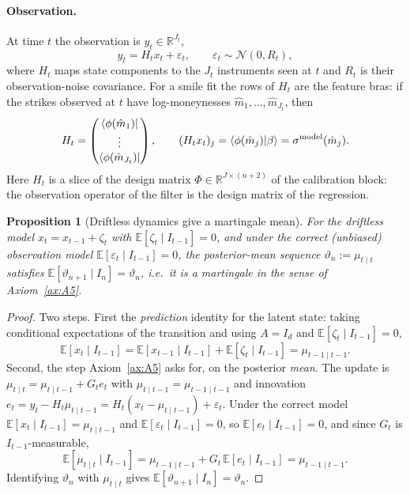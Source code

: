 \documentclass[11pt]{book}
\theoremstyle{plain}
\newtheorem{proposition}[theorem]{Proposition}
\theoremstyle{definition}
\theoremstyle{remark}
\newcommand{\bra}[1]{\mathinner{\langle #1 \rvert}}
\newcommand{\braket}[1]{\mathinner{\langle #1 \rangle}}
\newcommand{\ncdf}{N}                            %
\newcommand{\Nrm}{\mathcal{N}}                   %
\newcommand{\parvec}{\vartheta}                  %
\newcommand{\E}{\mathbb{E}}
\begin{document}
\paragraph{Observation.} At time $t$ the observation is $y_t\in\mathbb{R}^{J_t}$,
\[
    y_t = H_t x_t + \varepsilon_t,
    \qquad \varepsilon_t\sim\Nrm(0,R_t),
\]
where $H_t$ maps state components to the $J_t$ instruments seen at $t$ and $R_t$
is their observation-noise covariance. For a smile fit the rows of $H_t$ are the
feature bras: if the strikes observed at $t$ have log-moneynesses
$\hat m_1,\dots,\hat m_{J_t}$, then
\[
    H_t = \begin{pmatrix}\bra{\phi(\hat m_1)}\\ \vdots\\
    \bra{\phi(\hat m_{J_t})}\end{pmatrix},
    \qquad
    (H_t x_t)_j = \braket{\phi(\hat m_j)|\beta}
    = \sigma^{\text{model}}(\hat m_j).
\]
Here $H_t$ is a slice of the design matrix $\Phi\in\mathbb{R}^{J\times(n+2)}$ of
the calibration block: the observation operator of the filter is the design
matrix of the regression.

\begin{proposition}[Driftless dynamics give a martingale mean]
\label{prop:martingale}
For the driftless model $x_t=x_{t-1}+\zeta_t$ with $\E[\zeta_t\mid I_{t-1}]=0$,
and under the correct (unbiased) observation model $\E[\varepsilon_t\mid
I_{t-1}]=0$, the \emph{posterior-mean} sequence $\parvec_n:=\mu_{t\mid t}$
satisfies $\E[\parvec_{n+1}\mid I_n]=\parvec_n$, i.e.\ it is a martingale in the
sense of Axiom~\ref{ax:A5}.
\end{proposition}

\begin{proof}
Two steps. First the \emph{prediction} identity for the latent state: taking
conditional expectations of the transition and using $A=I_d$ and
$\E[\zeta_t\mid I_{t-1}]=0$,
\[
    \E[x_t\mid I_{t-1}] = \E[x_{t-1}\mid I_{t-1}] + \E[\zeta_t\mid I_{t-1}]
    = \mu_{t-1\mid t-1}.
\]
Second, the step Axiom~\ref{ax:A5} asks for, on the posterior
\emph{mean}. The update is $\mu_{t\mid t}=\mu_{t\mid t-1}+G_t e_t$ with
$\mu_{t\mid t-1}=\mu_{t-1\mid t-1}$ and innovation
$e_t=y_t-H_t\mu_{t\mid t-1}=H_t(x_t-\mu_{t\mid t-1})+\varepsilon_t$. Under the
correct model $\E[x_t\mid I_{t-1}]=\mu_{t\mid t-1}$ and
$\E[\varepsilon_t\mid I_{t-1}]=0$, so $\E[e_t\mid I_{t-1}]=0$, and since $G_t$ is
$I_{t-1}$-measurable,
\[
    \E[\mu_{t\mid t}\mid I_{t-1}]
    = \mu_{t-1\mid t-1} + G_t\,\E[e_t\mid I_{t-1}]
    = \mu_{t-1\mid t-1}.
\]
Identifying $\parvec_n$ with $\mu_{t\mid t}$ gives
$\E[\parvec_{n+1}\mid I_n]=\parvec_n$.
\end{proof}
\end{document}
